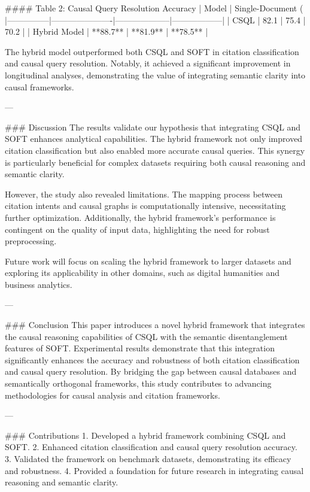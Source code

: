#### Table 2: Causal Query Resolution Accuracy
| Model         | Single-Document (%
|---------------|----------------------|--------------------|------------------|
| CSQL          | 82.1                | 75.4               | 70.2             |
| Hybrid Model  | **88.7**            | **81.9**           | **78.5**         |

The hybrid model outperformed both CSQL and SOFT in citation classification and causal query resolution. Notably, it achieved a significant improvement in longitudinal analyses, demonstrating the value of integrating semantic clarity into causal frameworks.

---

### Discussion
The results validate our hypothesis that integrating CSQL and SOFT enhances analytical capabilities. The hybrid framework not only improved citation classification but also enabled more accurate causal queries. This synergy is particularly beneficial for complex datasets requiring both causal reasoning and semantic clarity.

However, the study also revealed limitations. The mapping process between citation intents and causal graphs is computationally intensive, necessitating further optimization. Additionally, the hybrid framework's performance is contingent on the quality of input data, highlighting the need for robust preprocessing.

Future work will focus on scaling the hybrid framework to larger datasets and exploring its applicability in other domains, such as digital humanities and business analytics.

---

### Conclusion
This paper introduces a novel hybrid framework that integrates the causal reasoning capabilities of CSQL with the semantic disentanglement features of SOFT. Experimental results demonstrate that this integration significantly enhances the accuracy and robustness of both citation classification and causal query resolution. By bridging the gap between causal databases and semantically orthogonal frameworks, this study contributes to advancing methodologies for causal analysis and citation frameworks.

---

### Contributions
1. Developed a hybrid framework combining CSQL and SOFT.
2. Enhanced citation classification and causal query resolution accuracy.
3. Validated the framework on benchmark datasets, demonstrating its efficacy and robustness.
4. Provided a foundation for future research in integrating causal reasoning and semantic clarity.